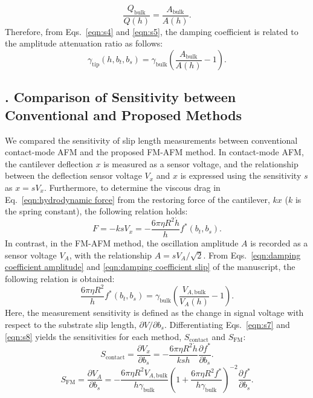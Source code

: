 \documentclass[journal=jacsat,manuscript=article]{achemso}
\newcounter{supppart}
\renewcommand{\thesupppart}{\Roman{supppart}}
\newcommand{\subsectionpart}[2]{%
  \refstepcounter{supppart}%
  \subsection{\thesupppart. #2}%
  \label{supppart:#1}%
}
\begin{document}
\begin{equation}
  \frac{Q_{\text{bulk}}}{Q(h)} = \frac{A_{\text{bulk}}}{A(h)}.
  \tag{S5}
  \label{eqn:s5}
\end{equation}
Therefore, from Eqs.~\ref{eqn:s4} and \ref{eqn:s5}, the damping coefficient is related to the amplitude attenuation ratio as follows:
\begin{equation}
  \gamma_{\text{tip}}(h, b_t, b_s) = \gamma_{\text{bulk}}\left(\frac{A_{\text{bulk}}}{A(h)} - 1\right).
  \tag{S6}
  \label{eqn:s6}
\end{equation}
\subsectionpart{sensitivity-comparison}{Comparison of Sensitivity between Conventional and Proposed Methods}

We compared the sensitivity of slip length measurements between conventional contact-mode AFM and the proposed FM-AFM method. In contact-mode AFM, the cantilever deflection \(x\) is measured as a sensor voltage, and the relationship between the deflection sensor voltage \(V_x\) and \(x\) is expressed using the sensitivity \(s\) as \(x = sV_x\). Furthermore, to determine the viscous drag in Eq.~\ref{eqn:hydrodynamic force} from the restoring force of the cantilever, \(kx\) (\(k\) is the spring constant), the following relation holds:
\begin{equation}
  F = -ksV_x = -\frac{6\pi\eta R^2 \dot{h}}{h} f^{*}(b_t, b_s).
  \tag{S7}
  \label{eqn:s7}
\end{equation}
In contrast, in the FM-AFM method, the oscillation amplitude \(A\) is recorded as a sensor voltage \(V_A\), with the relationship \(A = sV_A/\sqrt{2}\). From Eqs.~\ref{eqn:damping coefficient amplitude} and \ref{eqn:damping coefficient slip} of the manuscript, the following relation is obtained:
\begin{equation}
  \frac{6\pi\eta R^2}{h} f^{*}(b_t, b_s) = \gamma_{\text{bulk}}\left(\frac{V_{A,\text{bulk}}}{V_A(h)} - 1\right).
  \tag{S8}
  \label{eqn:s8}
\end{equation}
Here, the measurement sensitivity is defined as the change in signal voltage with respect to the substrate slip length, \(\partial V/\partial b_s\). Differentiating Eqs.~\ref{eqn:s7} and \ref{eqn:s8} yields the sensitivities for each method, \(S_{\text{contact}}\) and \(S_{\text{FM}}\):
\begin{equation}
  S_{\text{contact}} = \frac{\partial V_x}{\partial b_s} = -\frac{6\pi\eta R^2 \dot{h}}{k s h}\frac{\partial f^{*}}{\partial b_s}.
  \tag{S9}
  \label{eqn:s9}
\end{equation}
\begin{equation}
  S_{\text{FM}} = \frac{\partial V_A}{\partial b_s} = -\frac{6\pi\eta R^2 V_{A,\text{bulk}}}{h\gamma_{\text{bulk}}}\left(1 + \frac{6\pi\eta R^2 f^{*}}{h\gamma_{\text{bulk}}}\right)^{-2}\frac{\partial f^{*}}{\partial b_s}.
  \tag{S10}
  \label{eqn:s10}
\end{equation}
\end{document}
